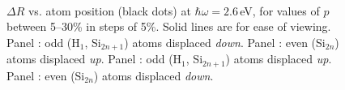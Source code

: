 \documentclass[pss]{wiley2sp} %
\begin{document}
\begin{figure}[htb]%
\centering
\hfill
{}
\\
\hfill
{}
\caption{$\Delta R$ vs. atom position (black dots) at $\hbar\omega = 2.6$\,eV,
for values of $p$ between 5--30\% in steps of 5\%. Solid lines are for ease of
viewing. Panel : odd (H$_{1}$, Si$_{2n+1}$) atoms displaced
\emph{down}. Panel : even (Si$_{2n}$) atoms displaced
\emph{up}. Panel : odd (H$_{1}$, Si$_{2n+1}$) atoms displaced
\emph{up}. Panel : even (Si$_{2n}$) atoms displaced
\emph{down}.}
\label{fig:3}
\end{figure}
\end{document}
